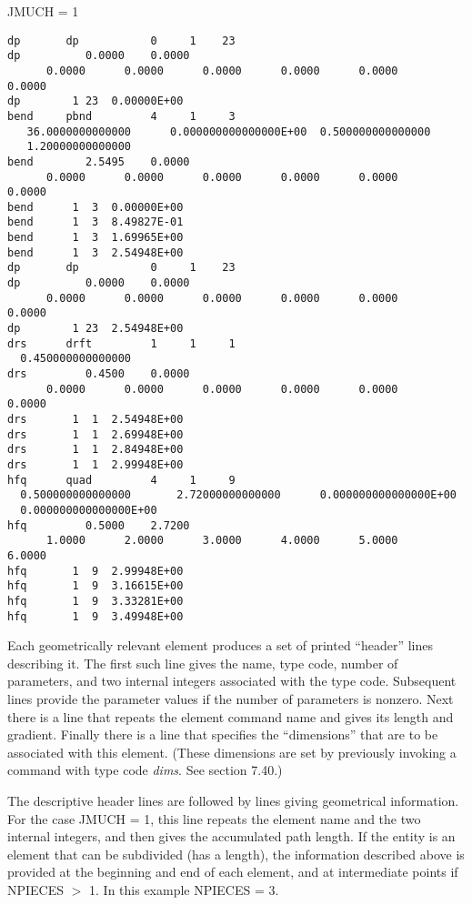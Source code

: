 JMUCH = 1

\begin{footnotesize}
\begin{verbatim}
dp       dp           0     1    23
dp          0.0000    0.0000
      0.0000      0.0000      0.0000      0.0000      0.0000      0.0000
dp        1 23  0.00000E+00
bend     pbnd         4     1     3
   36.0000000000000      0.000000000000000E+00  0.500000000000000
   1.20000000000000
bend        2.5495    0.0000
      0.0000      0.0000      0.0000      0.0000      0.0000      0.0000
bend      1  3  0.00000E+00
bend      1  3  8.49827E-01
bend      1  3  1.69965E+00
bend      1  3  2.54948E+00
dp       dp           0     1    23
dp          0.0000    0.0000
      0.0000      0.0000      0.0000      0.0000      0.0000      0.0000
dp        1 23  2.54948E+00
drs      drft         1     1     1
  0.450000000000000
drs         0.4500    0.0000
      0.0000      0.0000      0.0000      0.0000      0.0000      0.0000
drs       1  1  2.54948E+00
drs       1  1  2.69948E+00
drs       1  1  2.84948E+00
drs       1  1  2.99948E+00
hfq      quad         4     1     9
  0.500000000000000       2.72000000000000      0.000000000000000E+00
  0.000000000000000E+00
hfq         0.5000    2.7200
      1.0000      2.0000      3.0000      4.0000      5.0000      6.0000
hfq       1  9  2.99948E+00
hfq       1  9  3.16615E+00
hfq       1  9  3.33281E+00
hfq       1  9  3.49948E+00
\end{verbatim}
\end{footnotesize}

\noindent Each geometrically relevant element produces a set of printed
``header'' lines describing it.  The first such line gives the name, type
code, number of parameters, and two internal \Mary integers associated
with the type code.  Subsequent lines provide the parameter values if the
number of parameters is nonzero.  Next there is a line that repeats the
element command name and gives its length and gradient.  Finally there is
a line that specifies the ``dimensions'' that are to be associated with
this element.  (These dimensions are set by previously
invoking a command with type code {\em dims}.  See section 7.40.)

The descriptive header lines are followed by lines giving geometrical
information.  For the case JMUCH = 1, this line repeats the
element name and the two internal \Mary integers, and then gives
the accumulated path length.  If the entity is an element that can be
subdivided (has a length), the information described above is provided at
the beginning and end of each element, and at intermediate points if
NPIECES $>$ 1.  In this example NPIECES = 3.\\


